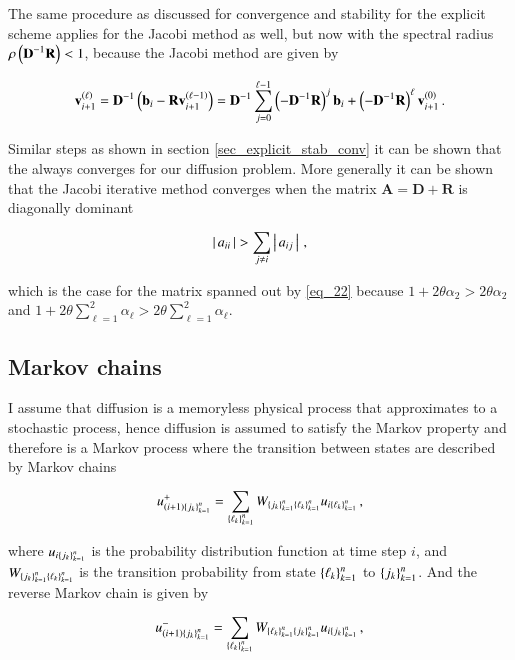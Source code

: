 \documentclass[11pt,english,a4paper]{article}
\begin{document}
\begin{flushleft}
The same procedure as discussed for convergence and stability for the explicit scheme applies for the Jacobi method as well, but now with the spectral radius $\rho\left({\textbf{D}^{-1} \textbf{R}}\right) < 1$, because the Jacobi method are given by 

\begin{align*}
\textbf{v}_{i+1}^{\left({\ell}\right)} = \textbf{D}^{-1}\left({\textbf{b}_i - \textbf{R}\textbf{v}_{i+1}^{\left({\ell-1}\right)}}\right) = \textbf{D}^{-1}\sum_{j=0}^{\ell-1} \left({-\textbf{D}^{-1}\textbf{R}}\right)^j \textbf{b}_i + \left({-\textbf{D}^{-1}\textbf{R}}\right)^\ell\textbf{v}_{i+1}^{(0)} \,.
\end{align*}

Similar steps as shown in section \ref{sec_explicit_stab_conv} it can be shown that the always converges for our diffusion problem. More generally it can be shown that the Jacobi iterative method converges when the matrix $\textbf{A} = \textbf{D}+ \textbf{R}$ is diagonally dominant 

\begin{align*}
\left\vert{\,a_{ii}\,}\right\vert > \sum_{j\neq i} \left\vert{\,a_{ij}\,}\right\vert\,,
\end{align*}

which is the case for the matrix spanned out by \eqref{eq_22} because $1+2\theta \alpha_2 > 2\theta \alpha_2$ and $1+2\theta\sum_{\ell=1}^2 \alpha_{\ell} > 2\theta\sum_{\ell=1}^2 \alpha_\ell$.

\subsection{Markov chains}

I assume that diffusion is a memoryless physical process that approximates to a stochastic process, hence diffusion is assumed to satisfy the Markov property and therefore is a Markov process where the transition between states are described by Markov chains 

\begin{align}
u_{(i+1)\left\lbrace{j_k}\right\rbrace_{k=1}^n}^+ = \sum_{\left\lbrace{\ell_k}\right\rbrace_{k=1}^n} W_{\left\lbrace{j_k}\right\rbrace_{k=1}^n\left\lbrace{\ell_k}\right\rbrace_{k=1}^n} u_{i\left\lbrace{\ell_k}\right\rbrace_{k=1}^n} \,,
\label{eq_37}
\end{align}

where $u_{i\left\lbrace{j_k}\right\rbrace_{k=1}^n}$ is the probability distribution function  at time step $i$, and $W_{\left\lbrace{j_k}\right\rbrace_{k=1}^n\left\lbrace{\ell_k}\right\rbrace_{k=1}^n}$  is the transition probability from state $\left\lbrace{\ell_k}\right\rbrace_{k=1}^n$ to $\left\lbrace{j_k}\right\rbrace_{k=1}^n$. And the reverse Markov chain is given by

\begin{align}
u_{(i+1)\left\lbrace{j_k}\right\rbrace_{k=1}^n}^- = \sum_{\left\lbrace{\ell_k}\right\rbrace_{k=1}^n} W_{\left\lbrace{\ell_k}\right\rbrace_{k=1}^n\left\lbrace{j_k}\right\rbrace_{k=1}^n} u_{i\left\lbrace{j_k}\right\rbrace_{k=1}^n} \,,
\label{eq_38}
\end{align}


\end{flushleft}
\end{document}
